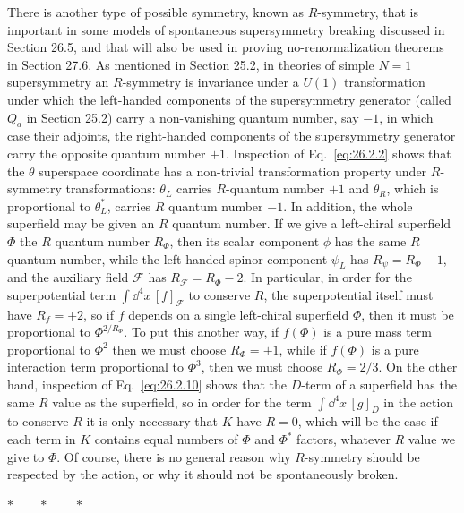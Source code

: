 There is another type of possible symmetry, known as $R$-symmetry, that is
important in some models of spontaneous supersymmetry breaking discussed in
Section 26.5, and that will also be used in proving no-renormalization
theorems in Section 27.6. As mentioned in Section 25.2, in theories of simple
$N=1$ supersymmetry an $R$-symmetry is invariance under a $U(1)$
transformation under which the left-handed components of the supersymmetry
generator (called $Q_a$ in Section 25.2) carry a non-vanishing quantum number,
say $-1$, in which case their adjoints, the right-handed components of the
supersymmetry generator carry the opposite quantum number $+1$. Inspection of
Eq.~\eqref{eq:26.2.2} shows that the $\theta$ superspace coordinate has a
non-trivial transformation property under $R$-symmetry transformations:
$\theta_L$ carries $R$-quantum number $+1$ and $\theta_R$, which is
proportional to $\theta_L^*$, carries $R$ quantum number $-1$. In addition,
the whole superfield may be given an $R$ quantum number. If we give a
left-chiral superfield $\Phi$ the $R$ quantum number $R_\Phi$, then its scalar
component $\phi$ has the same $R$ quantum number, while the left-handed spinor
component $\psi_L$ has $R_\psi=R_\Phi-1$, and the auxiliary field
$\mathcal{F}$ has $R_{\mathcal{F}}=R_\Phi-2$. In particular, in order for the
superpotential term $\int \dd^4x\,[f]_{\mathcal{F}}$ to conserve $R$, the
superpotential itself must have $R_f=+2$, so if $f$ depends on a single
left-chiral superfield $\Phi$, then it must be proportional to
$\Phi^{2/R_\Phi}$. To put this another way, if $f(\Phi)$ is a pure mass term
proportional to $\Phi^2$ then we must choose $R_\Phi=+1$, while if $f(\Phi)$
is a pure interaction term proportional to $\Phi^3$, then we must choose
$R_\Phi=2/3$. On the other hand, inspection of Eq.~\eqref{eq:26.2.10} shows
that the $D$-term of a superfield has the same $R$ value as the superfield, so
in order for the term $\int \dd^4x\,[g]_D$ in the action to conserve $R$ it is
only necessary that $K$ have $R=0$, which will be the case if each term in
$K$ contains equal numbers of $\Phi$ and $\Phi^*$ factors, whatever $R$ value
we give to $\Phi$. Of course, there is no general reason why $R$-symmetry
should be respected by the action, or why it should not be spontaneously
broken.

\begin{center}
\(\ast\qquad\ast\qquad\ast\)
\end{center}

